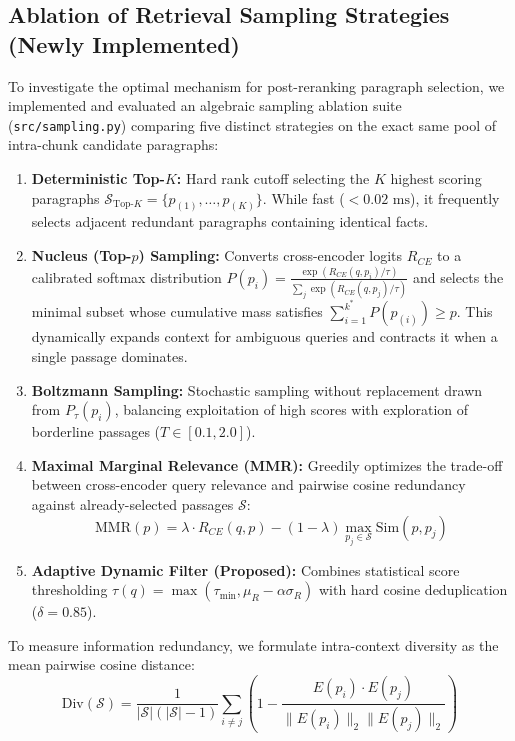 \documentclass[10pt,journal,compsoc]{IEEEtran}
\begin{document}
\subsection{Ablation of Retrieval Sampling Strategies (Newly Implemented)}
To investigate the optimal mechanism for post-reranking paragraph selection, we implemented and evaluated an algebraic sampling ablation suite (\texttt{src/sampling.py}) comparing five distinct strategies on the exact same pool of intra-chunk candidate paragraphs:
\begin{enumerate}
    \item \textbf{Deterministic Top-$K$:} Hard rank cutoff selecting the $K$ highest scoring paragraphs $\mathcal{S}_{\text{Top-}K} = \{p_{(1)}, \dots, p_{(K)}\}$. While fast ($<0.02\text{ ms}$), it frequently selects adjacent redundant paragraphs containing identical facts.
    \item \textbf{Nucleus (Top-$p$) Sampling:} Converts cross-encoder logits $R_{CE}$ to a calibrated softmax distribution $P(p_i) = \frac{\exp(R_{CE}(q, p_i)/\tau)}{\sum_j \exp(R_{CE}(q, p_j)/\tau)}$ and selects the minimal subset whose cumulative mass satisfies $\sum_{i=1}^{k^*} P(p_{(i)}) \ge p$. This dynamically expands context for ambiguous queries and contracts it when a single passage dominates.
    \item \textbf{Boltzmann Sampling:} Stochastic sampling without replacement drawn from $P_\tau(p_i)$, balancing exploitation of high scores with exploration of borderline passages ($T \in [0.1, 2.0]$).
    \item \textbf{Maximal Marginal Relevance (MMR):} Greedily optimizes the trade-off between cross-encoder query relevance and pairwise cosine redundancy against already-selected passages $\mathcal{S}$:
    \begin{equation}
    \text{MMR}(p) = \lambda \cdot R_{CE}(q, p) - (1 - \lambda) \max_{p_j \in \mathcal{S}} \text{Sim}(p, p_j)
    \end{equation}
    \item \textbf{Adaptive Dynamic Filter (Proposed):} Combines statistical score thresholding $\tau(q) = \max(\tau_{\min}, \mu_R - \alpha \sigma_R)$ with hard cosine deduplication ($\delta = 0.85$).
\end{enumerate}

To measure information redundancy, we formulate intra-context diversity as the mean pairwise cosine distance:
\begin{equation}
\text{Div}(\mathcal{S}) = \frac{1}{|\mathcal{S}|(|\mathcal{S}|-1)} \sum_{i \ne j} \left( 1 - \frac{E(p_i) \cdot E(p_j)}{\|E(p_i)\|_2 \|E(p_j)\|_2} \right)
\end{equation}
\end{document}
